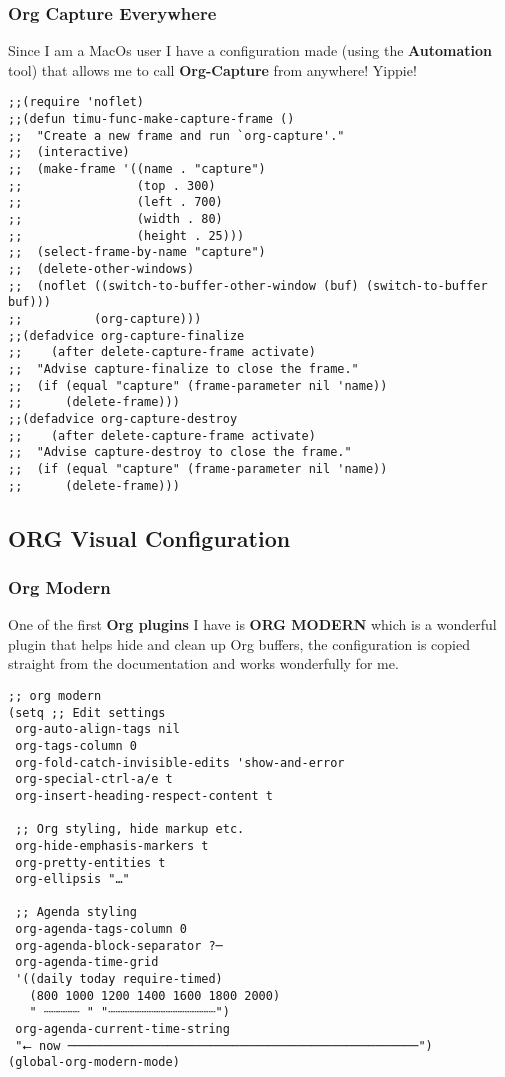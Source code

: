 \documentclass[11pt]{article}
\begin{document}
\subsubsection{Org Capture Everywhere}
\label{sec:org88189e9}
Since I am a MacOs user I have a configuration made (using the \textbf{Automation} tool) that allows me to call \textbf{Org-Capture} from anywhere! Yippie!
\begin{verbatim}
;;(require 'noflet)
;;(defun timu-func-make-capture-frame ()
;;  "Create a new frame and run `org-capture'."
;;  (interactive)
;;  (make-frame '((name . "capture")
;;                (top . 300)
;;                (left . 700)
;;                (width . 80)
;;                (height . 25)))
;;  (select-frame-by-name "capture")
;;  (delete-other-windows)
;;  (noflet ((switch-to-buffer-other-window (buf) (switch-to-buffer buf)))
;;          (org-capture)))
;;(defadvice org-capture-finalize
;;    (after delete-capture-frame activate)
;;  "Advise capture-finalize to close the frame."
;;  (if (equal "capture" (frame-parameter nil 'name))
;;      (delete-frame)))
;;(defadvice org-capture-destroy
;;    (after delete-capture-frame activate)
;;  "Advise capture-destroy to close the frame."
;;  (if (equal "capture" (frame-parameter nil 'name))
;;      (delete-frame)))

\end{verbatim}
\subsection{ORG Visual Configuration}
\label{sec:orge29a505}
\subsubsection{Org Modern}
\label{sec:org96e45d8}
One of the first \textbf{Org plugins} I have is \textbf{ORG MODERN} which is a wonderful plugin that helps hide and clean up Org buffers, the configuration is copied straight from the documentation and works wonderfully for me.

\begin{verbatim}
;; org modern
(setq ;; Edit settings
 org-auto-align-tags nil
 org-tags-column 0
 org-fold-catch-invisible-edits 'show-and-error
 org-special-ctrl-a/e t
 org-insert-heading-respect-content t

 ;; Org styling, hide markup etc.
 org-hide-emphasis-markers t
 org-pretty-entities t
 org-ellipsis "…"

 ;; Agenda styling
 org-agenda-tags-column 0
 org-agenda-block-separator ?─
 org-agenda-time-grid
 '((daily today require-timed)
   (800 1000 1200 1400 1600 1800 2000)
   " ┄┄┄┄┄ " "┄┄┄┄┄┄┄┄┄┄┄┄┄┄┄")
 org-agenda-current-time-string
 "⭠ now ─────────────────────────────────────────────────")
(global-org-modern-mode)
\end{verbatim}
\end{document}
